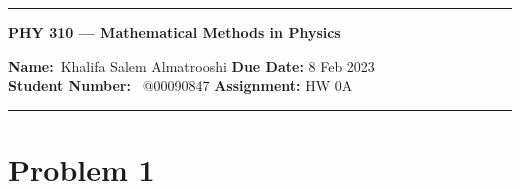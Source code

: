 \documentclass[]{article}
\title{}
\date{}
\newcommand{\bd}{\textbf}
\begin{document}
	\maketitle
	\begin{center}
		\hrule
		\vspace{.4cm}
		{\textbf { \large PHY 310 --- Mathematical Methods in Physics}}
	\end{center}
	{\bd{Name:}\ Khalifa Salem Almatrooshi \hspace{\fill} \bd{Due Date:} 8 Feb 2023 \\
		{ \bd{Student Number:}} \ @00090847 \hspace{\fill} \bd{Assignment:} HW 0A \\
		\hrule
	
	
	\section*{Problem 1}
	
}
\end{document}
